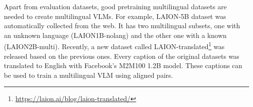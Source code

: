 Apart from evaluation datasets, good pretraining multilingual datasets are needed to create multilingual VLMs. For example, LAION-5B \cite{schuhmann2022laionb} dataset was automatically collected from the web. It has two multilingual subsets, one with an unknown language (LAION1B-nolang) and the other one with a known (LAION2B-multi). Recently, a new dataset called LAION-translated\footnote{\url{https://laion.ai/blog/laion-translated/}} was released based on the previous ones. Every caption of the original datasets was translated to English with Facebook’s M2M100 1.2B model. These captions can be used to train a multilingual VLM using aligned pairs.

